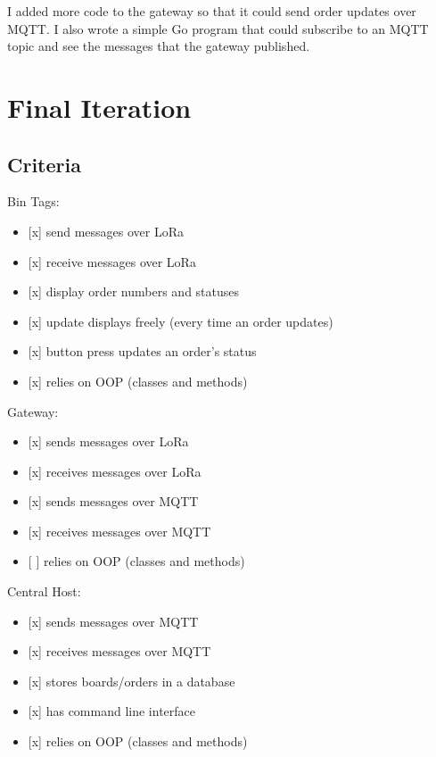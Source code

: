 \documentclass{article}
\begin{document}
I added more code to the gateway so that it could send order updates
over MQTT. I also wrote a simple Go program that could subscribe to an
MQTT topic and see the messages that the gateway published.

\section{Final Iteration}\label{final-iteration}

\subsection{Criteria}\label{criteria-4}

Bin Tags:

\begin{itemize}
\item
  {[}x{]} send messages over LoRa
\item
  {[}x{]} receive messages over LoRa
\item
  {[}x{]} display order numbers and statuses
\item
  {[}x{]} update displays freely (every time an order updates)
\item
  {[}x{]} button press updates an order's status
\item
  {[}x{]} relies on OOP (classes and methods)
\end{itemize}

Gateway:

\begin{itemize}
\item
  {[}x{]} sends messages over LoRa
\item
  {[}x{]} receives messages over LoRa
\item
  {[}x{]} sends messages over MQTT
\item
  {[}x{]} receives messages over MQTT
\item
  {[} {]} relies on OOP (classes and methods)
\end{itemize}

Central Host:

\begin{itemize}
\item
  {[}x{]} sends messages over MQTT
\item
  {[}x{]} receives messages over MQTT
\item
  {[}x{]} stores boards/orders in a database
\item
  {[}x{]} has command line interface
\item
  {[}x{]} relies on OOP (classes and methods)
\end{itemize}
\end{document}

